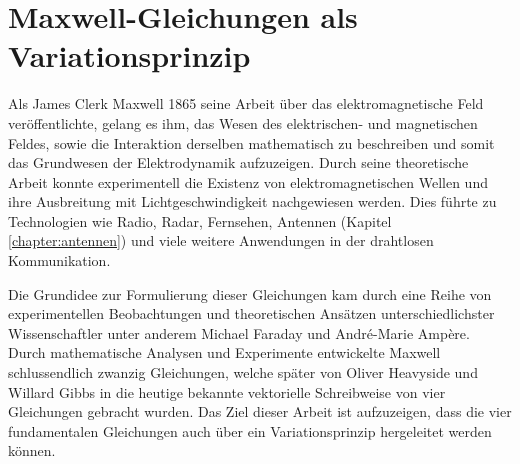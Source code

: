 %
%
%
%

\chapter{Maxwell-Gleichungen als Variationsprinzip\label{chapter:maxwell}}
\begin{refsection}
%
%
%
%

\noindent
Als James Clerk Maxwell 1865 seine Arbeit über das elektromagnetische Feld veröffentlichte, gelang es ihm, das Wesen des elektrischen- und magnetischen Feldes, sowie die Interaktion derselben mathematisch zu beschreiben und somit das Grundwesen der Elektrodynamik aufzuzeigen.
%
%
%
Durch seine theoretische Arbeit konnte experimentell die Existenz von elektromagnetischen Wellen und ihre Ausbreitung mit Lichtgeschwindigkeit nachgewiesen werden.
%
Dies führte zu Technologien wie Radio, Radar, Fernsehen, Antennen (Kapitel \ref{chapter:antennen}) und viele weitere Anwendungen in der drahtlosen Kommunikation. 
%
%
%
%
%
%

Die Grundidee zur Formulierung dieser Gleichungen kam durch eine Reihe von experimentellen Beobachtungen und theoretischen Ansätzen unterschiedlichster Wissenschaftler unter anderem Michael Faraday und André-Marie Ampère.
%
%
Durch mathematische Analysen und Experimente entwickelte Maxwell schlussendlich zwanzig Gleichungen, welche später von Oliver Heavyside und Willard Gibbs in die heutige bekannte vektorielle Schreibweise von vier Gleichungen gebracht wurden.
%
%
Das Ziel dieser Arbeit ist aufzuzeigen, dass die vier fundamentalen Gleichungen  auch über ein Variationsprinzip hergeleitet werden können.









\printbibliography[heading=subbibliography]

\end{refsection}
